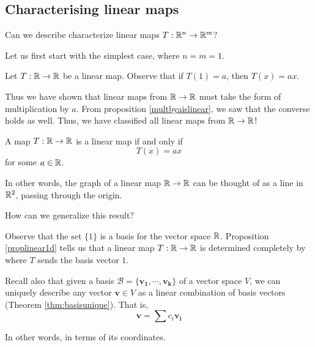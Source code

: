 \subsection{Characterising linear maps}

\begin{motivating}
Can we describe characterize linear maps $T: \mathbb{R}^n \to \mathbb{R}^m$?
\end{motivating}

Let us first start with the simplest case, where $n = m = 1$.

\begin{proposition}\label{proplinear1d}
    Let $T: \mathbb{R} \to \mathbb{R}$ be a linear map. Observe that if $T(1) = a$, then $T(x) = ax$.
\end{proposition}

Thus we have shown that linear maps from $\mathbb{R} \to \mathbb{R}$ must take the form of multiplication by $a$. From proposition \ref{multbyaislinear}, we saw that the converse holds as well.  Thus, we have classified all linear maps from $\mathbb{R} \to \mathbb{R}$!

\begin{theorem}\label{linear1d}
    A map $T: \mathbb{R} \to \mathbb{R}$ is a linear map if and only if $$T(x) = ax$$ for some $a \in \mathbb{R}$.
    \end{theorem}

In other words, the graph of a linear map $\mathbb{R} \to \mathbb{R}$ can be thought of as a line in $\mathbb{R}^2$, passing through the origin.


    
    \begin{motivating}
    How can we generalize this result?
    \end{motivating}

    Observe that the set $\{1\}$ is a basis for the vector space $\mathbb{R}$.  Proposition \ref{proplinear1d} tells us that a linear map $T: \mathbb{R} \to \mathbb{R}$ is determined completely by where $T$ sends the basis vector $1$.  
    
    Recall also that given a basis $\mathscr{B} = \{\bm{v_1}, \cdots, \bm{v_k}\}$ of a vector space $V$, we can uniquely describe any vector $\bm{v} \in V$ as a linear combination of basis vectors (Theorem \ref{thm:basisunique}).  That is, $$\bm{v} = \sum c_i \bm{v_i}$$
    
    In other words, in terms of its coordinates.
    
